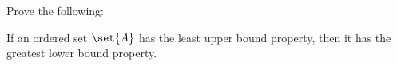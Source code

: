 \documentclass[../main.tex]{subfiles}
\begin{document}
\problem{}\label{s3p13}

Prove the following:
\begin{thm}
	If an ordered set \(\set{A}\) has the least upper bound property, then
	it has the greatest lower bound property.
\end{thm}

\todo{}
\end{document}
